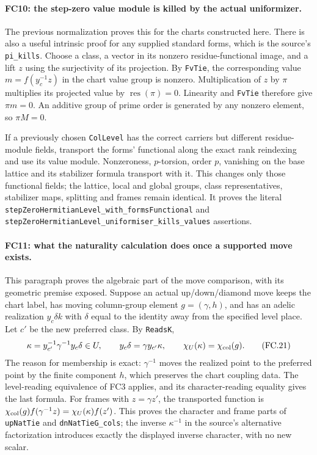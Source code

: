 \paragraph{FC10: the step-zero value module is killed by the actual
uniformizer.}
The previous normalization proves this for the charts constructed here.
There is also a useful intrinsic proof for any supplied standard forms,
which is the source's \texttt{pi\_kills}. Choose a class, a vector in
its nonzero residue-functional image, and a lift $z$ using the
surjectivity of its projection. By \texttt{FvTie}, the corresponding
value $m=f(y_c^{-1}z)$ in the chart value group is nonzero.
Multiplication of $z$ by $\pi$ multiplies its projected value by
$\operatorname{res}(\pi)=0$. Linearity and \texttt{FvTie} therefore
give $\pi m=0$. An additive group of prime order is generated by
any nonzero element, so $\pi M=0$.

If a previously chosen \texttt{ColLevel} has the correct carriers but
different residue-module fields, transport the forms' functional along
the exact rank reindexing and use its value module. Nonzeroness,
$p$-torsion, order $p$, vanishing on the base lattice and its stabilizer
formula transport with it. This changes only those functional fields;
the lattice, local and global groups, class representatives, stabilizer
maps, splitting and frames remain identical. It proves the literal
\texttt{stepZeroHermitianLevel\_with\_formsFunctional} and
\texttt{stepZeroHermitianLevel\_uniformiser\_kills\_values} assertions.

\paragraph{FC11: what the naturality calculation does once a supported
move exists.}
This paragraph proves the algebraic part of the move comparison, with
its geometric premise exposed. Suppose an actual up/down/diamond move
keeps the chart label, has moving column-group element $g=(\gamma,h)$,
and has an adelic realization $y_c\delta k$ with $\delta$ equal to
the identity away from the specified level place. Let $c'$ be the
new preferred class. By \texttt{ReadsK},
\[
 \kappa=y_{c'}^{-1}\gamma^{-1}y_c\delta\in U,\qquad
 y_c\delta=\gamma y_{c'}\kappa,
 \qquad \chi_U(\kappa)=\chi_{\rm col}(g).              \tag{FC.21}
\]
The reason for membership is exact: $\gamma^{-1}$ moves the realized
point to the preferred point by the finite component $h$, which
preserves the chart coupling data. The level-reading equivalence of
FC3 applies, and its character-reading equality gives the last formula.
For frames with $z=\gamma z'$, the transported function is
$\chi_{\rm col}(g)f(\gamma^{-1}z)=\chi_U(\kappa)f(z')$.
This proves the character and frame parts of \texttt{upNatTie} and
\texttt{dnNatTieG\_cols}; the inverse $\kappa^{-1}$ in the source's
alternative factorization introduces exactly the displayed inverse
character, with no new scalar.

